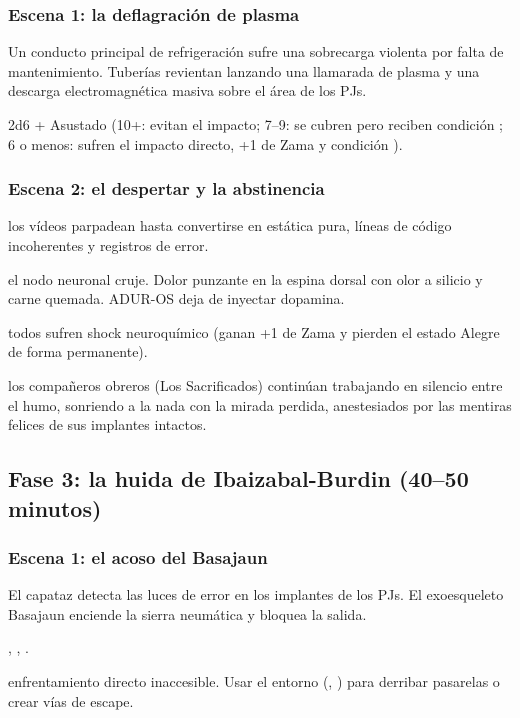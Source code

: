 \subsubsection{Escena 1: la deflagración de plasma}
Un conducto principal de refrigeración sufre una sobrecarga violenta por falta de mantenimiento. Tuberías revientan lanzando una llamarada de plasma y una descarga electromagnética masiva sobre el área de los PJs.\par
{} 2d6 + Asustado (10+: evitan el impacto; 7--9: se cubren pero reciben condición ; 6 o menos: sufren el impacto directo, +1 de Zama y condición ).

\subsubsection{Escena 2: el despertar y la abstinencia}
 los vídeos parpadean hasta convertirse en estática pura, líneas de código incoherentes y registros de error.\par
{} el nodo neuronal cruje. Dolor punzante en la espina dorsal con olor a silicio y carne quemada. ADUR-OS deja de inyectar dopamina.\par
{} todos sufren shock neuroquímico (ganan +1 de Zama y pierden el estado Alegre de forma permanente).\par
{} los compañeros obreros (Los Sacrificados) continúan trabajando en silencio entre el humo, sonriendo a la nada con la mirada perdida, anestesiados por las mentiras felices de sus implantes intactos.

\subsection{Fase 3: la huida de Ibaizabal-Burdin (40--50 minutos)}

\subsubsection{Escena 1: el acoso del Basajaun}
El capataz detecta las luces de error en los implantes de los PJs. El exoesqueleto Basajaun enciende la sierra neumática y bloquea la salida.\par
{} , , .\par
{} enfrentamiento directo inaccesible. Usar el entorno (, ) para derribar pasarelas o crear vías de escape.

